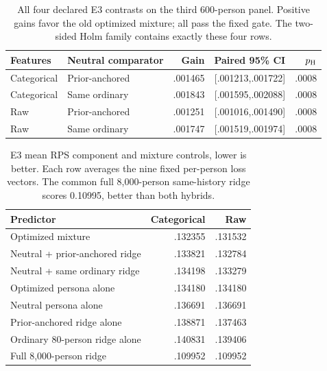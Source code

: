 \begin{table}[H]\centering\scriptsize
\caption{All four declared E3 contrasts on the third 600-person panel.
Positive gains favor the old optimized mixture; all pass the fixed gate.
The two-sided Holm family contains exactly these four rows.}
\label{tab:e3-full}
\begin{tabular}{@{}llrrr@{}}\toprule
Features & Neutral comparator & Gain & Paired 95\% CI & $p_{\rm H}$\\\midrule
Categorical & Prior-anchored & .001465 & [.001213,.001722] & .0008\\
Categorical & Same ordinary & .001843 & [.001595,.002088] & .0008\\
Raw & Prior-anchored & .001251 & [.001016,.001490] & .0008\\
Raw & Same ordinary & .001747 & [.001519,.001974] & .0008\\\bottomrule
\end{tabular}\end{table}

\begin{table}[H]\centering\scriptsize
\caption{E3 mean RPS component and mixture controls, lower is better.
Each row averages the nine fixed per-person loss vectors. The common full
8,000-person same-history ridge scores 0.10995, better than both hybrids.}
\label{tab:e3-components}
\begin{tabular}{@{}lrr@{}}\toprule
Predictor & Categorical & Raw\\\midrule
Optimized mixture & .132355 & .131532\\
Neutral + prior-anchored ridge & .133821 & .132784\\
Neutral + same ordinary ridge & .134198 & .133279\\
Optimized persona alone & .134180 & .134180\\
Neutral persona alone & .136691 & .136691\\
Prior-anchored ridge alone & .138871 & .137463\\
Ordinary 80-person ridge alone & .140831 & .139406\\
Full 8,000-person ridge & .109952 & .109952\\\bottomrule
\end{tabular}\end{table}

